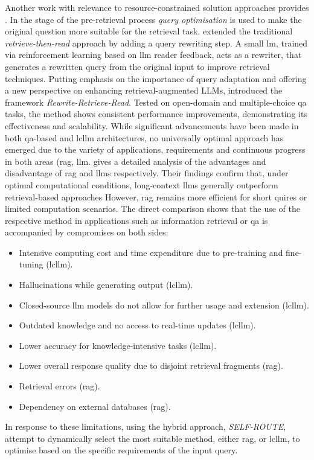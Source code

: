 %
Another work with relevance to resource-constrained solution approaches provides \citet{Ma2023QueryRF}.
In the stage of the pre-retrieval process \textit{query optimisation} is used to make the original question more suitable for the retrieval task.
\citet{Ma2023QueryRF} extended the traditional \textit{retrieve-then-read} approach by adding a query rewriting step.
A small \ac{lm}, trained via reinforcement learning based on \ac{llm} reader feedback, acts as a rewriter, that generates a rewritten query from the original input to improve retrieval techniques. 
Putting emphasis on the importance of query adaptation and offering a new perspective on enhancing retrieval-augmented LLMs, \citet{Ma2023QueryRF} introduced the framework \textit{Rewrite-Retrieve-Read}.
Tested on open-domain and multiple-choice \ac{qa} tasks, the method shows consistent performance improvements, demonstrating its effectiveness and scalability.
%
While significant advancements have been made in both \ac{qa}-based and \ac{lcllm} architectures, no universally optimal approach has emerged due to the variety of applications, requirements and continuous progress in both areas (\ac{rag}, \ac{llm}. 
\citet{Li2024RetrievalAG} gives a detailed analysis of the advantages and disadvantage of \ac{rag} and \ac{llm}s respectively.
Their findings confirm that, under optimal computational conditions, long-context \ac{llm}s generally outperform retrieval-based approaches
However, \ac{rag} remains more efficient for short quires or limited computation scenarios.
The direct comparison shows that the use of the respective method in applications such as information retrieval or \ac{qa} is accompanied by compromises on both sides:
\begin{itemize}
    \item Intensive computing cost and time expenditure due to pre-training and fine-tuning (\ac{lcllm}).
    \item Hallucinations while generating output (\ac{lcllm}).
    \item Closed-source \ac{llm} models do not allow for further usage and extension (\ac{lcllm}).
    \item Outdated knowledge and no access to real-time updates (\ac{lcllm}).
    \item Lower accuracy for knowledge-intensive tasks (\ac{lcllm}).
    \item Lower overall response quality due to disjoint retrieval fragments (\ac{rag}).
    \item Retrieval errors (\ac{rag}).
    \item Dependency on external databases (\ac{rag}).
\end{itemize}
%
In response to these limitations, \citet{Li2024RetrievalAG} using the hybrid approach, \textit{SELF-ROUTE}, attempt to dynamically select the most suitable method, either \ac{rag}, or \ac{lcllm}, to optimise based on the specific requirements of the input query. 


